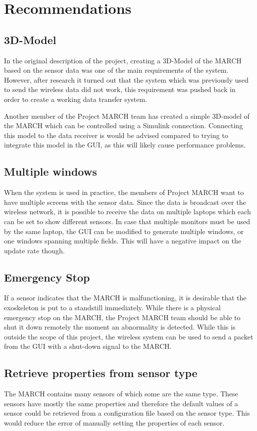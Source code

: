 \chapter{Recommendations}
\label{ch:rec}
\section{3D-Model}
In the original description of the project, creating a 3D-Model of the MARCH based on the sensor data was one of the main requirements of the system. However, after research it turned out that the system which was previously used to send the wireless data did not work, this requirement was pushed back in order to create a working data transfer system.  

Another member of the Project MARCH team has created a simple 3D-model of the MARCH which can be controlled using a Simulink connection. Connecting this model to the data receiver is would be advised compared to trying to integrate this model in the GUI, as this will likely cause performance problems.

\section{Multiple windows}
When the system is used in practice, the members of Project MARCH want to have multiple screens with the sensor data. Since the data is broadcast over the wireless network, it is possible to receive the data on multiple laptops which each can be set to show different sensors. In case that multiple monitors must be used by the same laptop, the GUI can be modified to generate multiple windows, or one windows spanning multiple fields. This will have a negative impact on the update rate though.

\section{Emergency Stop}
If a sensor indicates that the MARCH is malfunctioning, it is desirable that the exoskeleton is put to a standstill immediately. While there is a physical emergency stop on the MARCH, the Project MARCH team should be able to shut it down remotely the moment an abnormality is detected. While this is outside the scope of this project, the wireless system can be used to send a packet from the GUI with a shut-down signal to the MARCH. 

\section{Retrieve properties from sensor type}
The MARCH contains many sensors of which some are the same type. These sensors have mostly the same properties and therefore the default values of a sensor could be retrieved from a configuration file based on the sensor type. This would reduce the error of manually setting the properties of each sensor.


